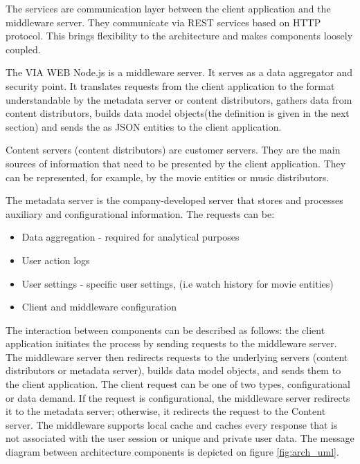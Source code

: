The services are communication layer between the client application and the middleware server. They communicate via REST services based on HTTP protocol. This brings flexibility to the architecture and makes components loosely coupled.

The VIA WEB Node.js is a middleware server. It serves as a data aggregator and security point. It translates requests from the client application to the format understandable by the metadata server or content distributors, gathers data from content distributors, builds data model objects(the definition is given in the next section) and sends the as JSON entities to the client application.

Content servers (content distributors) are customer servers. They are the main sources of information that need to be presented by the client application. They can be represented, for example, by the movie entities or music distributors.

The metadata server is the company-developed server that stores and processes auxiliary and configurational information. The requests can be: 

\begin{itemize}
	\item Data aggregation - required for analytical purposes
	\item User action logs 
	\item User settings - specific user settings, (i.e watch history for movie entities)
	\item Client and middleware configuration
\end{itemize} 

The interaction between components can be described as follows: the client application initiates the process by  sending requests to the middleware server. The middleware server then redirects requests to the underlying servers (content distributors or metadata server), builds data model objects, and sends them to the client application. The client request can be one of two types, configurational or data demand. If the request is configurational, the middleware server redirects it to the metadata server; otherwise, it redirects the request to the Content server. The middleware supports local cache and caches every response that is not associated with the user session or unique and private user data. The message diagram between architecture components is depicted on figure \ref{fig:arch_uml}.


